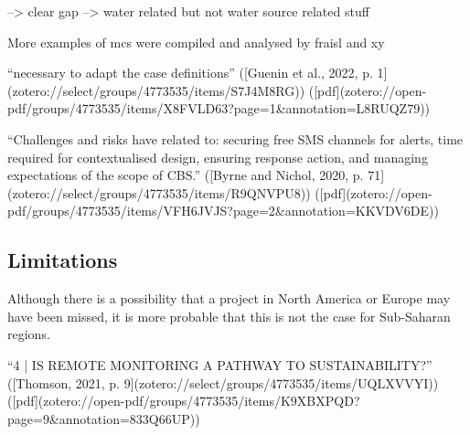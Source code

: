 {--> clear gap --> water related but not water source related stuff

More examples of \acrshort*{mcs} were compiled and analysed by fraisl and xy






“necessary to adapt the case definitions” ([Guenin et al., 2022, p. 1](zotero://select/groups/4773535/items/S7J4M8RG)) ([pdf](zotero://open-pdf/groups/4773535/items/X8FVLD63?page=1&annotation=L8RUQZ79))

“Challenges and risks have related to: securing free SMS channels for alerts, time required for contextualised design, ensuring response action, and managing expectations of the scope of CBS.” ([Byrne and Nichol, 2020, p. 71](zotero://select/groups/4773535/items/R9QNVPU8)) ([pdf](zotero://open-pdf/groups/4773535/items/VFH6JVJS?page=2&annotation=KKVDV6DE))

\subsection{Limitations}

Although there is a possibility that a project in North America or Europe may have been missed, it is more probable that this is not the case for Sub-Saharan regions.

“4 | IS REMOTE MONITORING A PATHWAY TO SUSTAINABILITY?” ([Thomson, 2021, p. 9](zotero://select/groups/4773535/items/UQLXVVYI)) ([pdf](zotero://open-pdf/groups/4773535/items/K9XBXPQD?page=9&annotation=833Q66UP))

}
